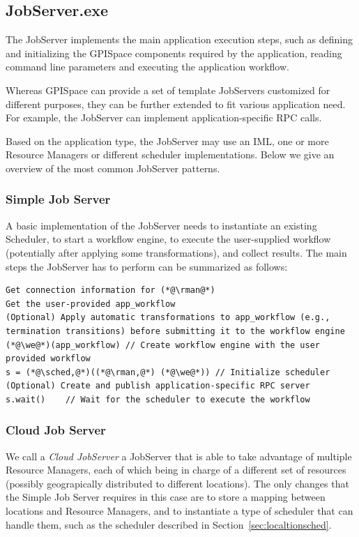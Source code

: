 \documentclass[10pt]{article}
\newcommand{\sched}{Scheduler\xspace}
\newcommand{\rman}{RM\xspace}
\begin{document}
\subsection{JobServer.exe}
The JobServer implements the main application execution steps, such as defining
and initializing the GPISpace components required by the application, reading
command line parameters and executing the application workflow.

Whereas GPISpace can provide a set of template JobServers customized for
different purposes, they can be further extended to fit various application
need. For example, the JobServer can implement application-specific RPC calls.

Based on the application type, the JobServer may use an IML, one or more
Resource Managers or different scheduler implementations. Below we give an
overview of the most common JobServer patterns.

\subsubsection{Simple Job Server}
A basic implementation of the JobServer needs to instantiate an existing
Scheduler, to start a workflow engine, to execute the user-supplied workflow
(potentially after applying some transformations), and collect results.
The main steps the JobServer has to perform can be summarized as follows:
\begin{lstlisting}
Get connection information for (*@\rman@*)
Get the user-provided app_workflow 
(Optional) Apply automatic transformations to app_workflow (e.g., termination transitions) before submitting it to the workflow engine
(*@\we@*)(app_workflow) // Create workflow engine with the user provided workflow
s = (*@\sched,@*)((*@\rman,@*) (*@\we@*)) // Initialize scheduler
(Optional) Create and publish application-specific RPC server
s.wait()    // Wait for the scheduler to execute the workflow
\end{lstlisting}


\subsubsection{Cloud Job Server}
We call a \emph{Cloud JobServer} a JobServer that is able to take advantage of
multiple Resource Managers, each of which being in charge of a different set of
resources (possibly geograpically distributed to different locations).
The only changes that the Simple Job Server requires in this case are to store a
mapping between locations and Resource Managers, and to instantiate a type of
scheduler that can handle them, such as the scheduler described in
Section~\ref{sec:localtionsched}.
\end{document}

